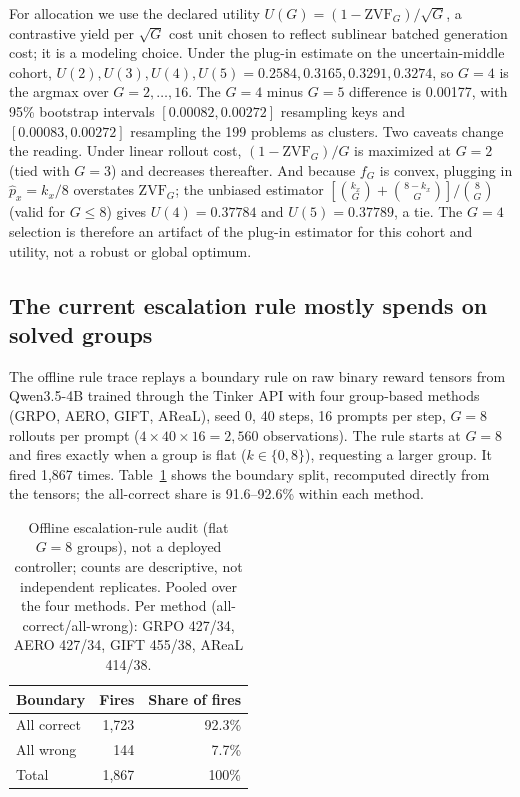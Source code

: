\documentclass{article}
\begin{document}
For allocation we use the declared utility $U(G)=(1-\mathrm{ZVF}_G)/\sqrt{G}$,
a contrastive yield per $\sqrt{G}$ cost unit chosen to reflect sublinear batched
generation cost; it is a modeling choice.  Under the plug-in estimate on the
uncertain-middle cohort, $U(2),U(3),U(4),U(5)=0.2584,0.3165,0.3291,0.3274$, so
$G=4$ is the argmax over $G=2,\ldots,16$.  The $G=4$ minus $G=5$ difference is
0.00177, with 95\% bootstrap intervals $[0.00082,0.00272]$ resampling keys and
$[0.00083,0.00272]$ resampling the 199 problems as clusters.  Two caveats
change the reading.  Under linear rollout cost, $(1-\mathrm{ZVF}_G)/G$ is
maximized at $G=2$ (tied with $G=3$) and decreases thereafter.  And because
$f_G$ is convex, plugging in $\hat p_x=k_x/8$ overstates $\mathrm{ZVF}_G$; the
unbiased estimator $[\binom{k_x}{G}+\binom{8-k_x}{G}]/\binom{8}{G}$ (valid for
$G\le8$) gives $U(4)=0.37784$ and $U(5)=0.37789$, a tie.  The $G=4$ selection is
therefore an artifact of the plug-in estimator for this cohort and utility, not
a robust or global optimum.

\subsection{The current escalation rule mostly spends on solved groups}

The offline rule trace replays a boundary rule on raw binary reward tensors from
Qwen3.5-4B trained through the Tinker API with four group-based methods (GRPO,
AERO, GIFT, AReaL), seed 0, 40 steps, 16 prompts per step, $G=8$ rollouts per
prompt ($4\times40\times16=2{,}560$ observations).  The rule starts at $G=8$
and fires exactly when a group is flat ($k\in\{0,8\}$), requesting a larger
group.  It fired 1,867 times.  Table~\ref{tab:controller-audit} shows the
boundary split, recomputed directly from the tensors; the all-correct share is
91.6--92.6\% within each method.

\begin{table}[t]
\centering
\caption{Offline escalation-rule audit (flat $G{=}8$ groups), not a deployed
controller; counts are descriptive, not independent replicates.  Pooled over
the four methods.  Per method (all-correct/all-wrong): GRPO 427/34, AERO 427/34,
GIFT 455/38, AReaL 414/38.}
\label{tab:controller-audit}
\small
\begin{tabular}{@{}lrr@{}}
\toprule
Boundary & Fires & Share of fires \\
\midrule
All correct & 1,723 & 92.3\% \\
All wrong & 144 & 7.7\% \\
\midrule
Total & 1,867 & 100\% \\
\bottomrule
\end{tabular}
\end{table}
\end{document}
